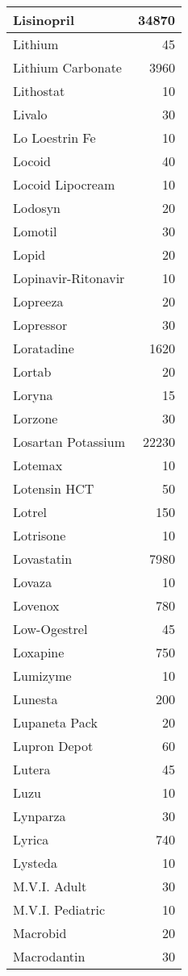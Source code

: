 \documentclass[
]{article}
\begin{document}
\begin{table}
\begin{tabular}[t]{l|r}
\hline
Lisinopril & 34870\\
\hline
Lithium & 45\\
\hline
Lithium Carbonate & 3960\\
\hline
Lithostat & 10\\
\hline
Livalo & 30\\
\hline
Lo Loestrin Fe & 10\\
\hline
Locoid & 40\\
\hline
Locoid Lipocream & 10\\
\hline
Lodosyn & 20\\
\hline
Lomotil & 30\\
\hline
Lopid & 20\\
\hline
Lopinavir-Ritonavir & 10\\
\hline
Lopreeza & 20\\
\hline
Lopressor & 30\\
\hline
Loratadine & 1620\\
\hline
Lortab & 20\\
\hline
Loryna & 15\\
\hline
Lorzone & 30\\
\hline
Losartan Potassium & 22230\\
\hline
Lotemax & 10\\
\hline
Lotensin HCT & 50\\
\hline
Lotrel & 150\\
\hline
Lotrisone & 10\\
\hline
Lovastatin & 7980\\
\hline
Lovaza & 10\\
\hline
Lovenox & 780\\
\hline
Low-Ogestrel & 45\\
\hline
Loxapine & 750\\
\hline
Lumizyme & 10\\
\hline
Lunesta & 200\\
\hline
Lupaneta Pack & 20\\
\hline
Lupron Depot & 60\\
\hline
Lutera & 45\\
\hline
Luzu & 10\\
\hline
Lynparza & 30\\
\hline
Lyrica & 740\\
\hline
Lysteda & 10\\
\hline
M.V.I. Adult & 30\\
\hline
M.V.I. Pediatric & 10\\
\hline
Macrobid & 20\\
\hline
Macrodantin & 30\\

\end{tabular}
\end{table}
\end{document}
